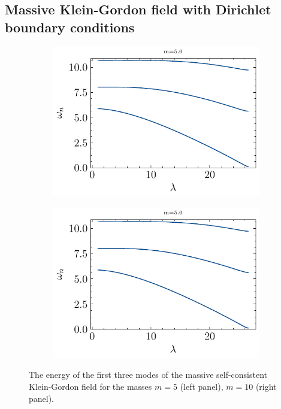 \subsection{Massive Klein-Gordon field with Dirichlet boundary conditions}

\begin{figure}
\begin{subfigure}{0.5\textwidth}
    \centering
    \includegraphics[width=\linewidth]{figures/dirichlet/eigenvaluesDirichlet m5.pdf}
\end{subfigure}    
\begin{subfigure}{0.5\textwidth}
    \centering
    \includegraphics[width=\linewidth]{figures/dirichlet/eigenvaluesDirichlet m5.pdf}
\end{subfigure}    
\caption{The energy of the first three modes of the massive self-consistent Klein-Gordon field for the masses $m=5$ (left panel), $m=10$ (right panel).}
    \label{fig:eigenvaluesHadamardDirichletMassive}
\end{figure}


